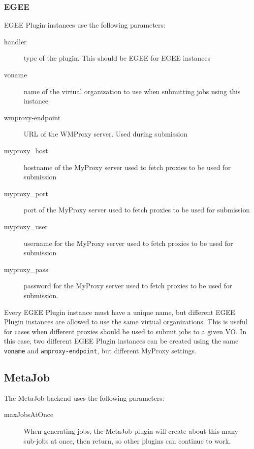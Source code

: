 \documentclass[a4paper, 12pt]{article}
\begin{document}
\subsubsection{EGEE}

EGEE Plugin instances use the following parameters:
\begin{description}
\item[handler] type of the plugin. This should be EGEE for EGEE instances
\item[voname] name of the virtual organization to use when submitting jobs using this instance
\item[wmproxy-endpoint] URL of the WMProxy server. Used during submission
\item[myproxy\_host] hostname of the MyProxy server used to fetch proxies to be used for submission
\item[myproxy\_port] port of the MyProxy server used to fetch proxies to be used for submission
\item[myproxy\_user] username for the MyProxy server used to fetch proxies to be used for submission
\item[myproxy\_pass] password for the MyProxy server used to fetch proxies to be used for submission.
\end{description}

Every EGEE Plugin instance must have a unique name, but different EGEE Plugin instances are allowed to use the same virtual organizations. This is useful for cases when different proxies should be used to submit jobs to a given VO. In this case, two different EGEE Plugin instances can be created using the same \texttt{voname} and \texttt{wmproxy-endpoint}, but different MyProxy settings.

\subsection{MetaJob}
The MetaJob backend uses the following parameters:
\begin{description}
\item[maxJobsAtOnce] When generating jobs, the MetaJob plugin will create about
  this many sub-jobs at once, then return, so other plugins can continue to
  work.
\end{description}

\end{document}
